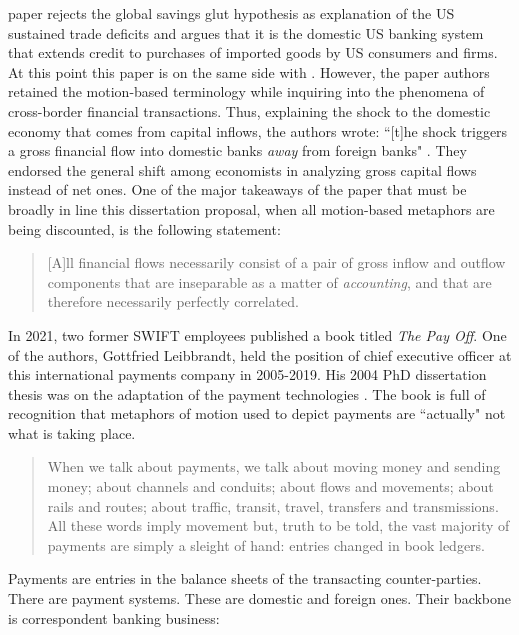 \cite{kumhof2020} paper rejects the global savings glut hypothesis as explanation of the US sustained trade deficits and argues that it is the domestic US banking system that extends credit to purchases of imported goods by US consumers and firms.
At this point this paper is on the same side with \cite{mosler2010,mosler2023}.
However, the paper authors retained the motion-based terminology while inquiring into the phenomena of cross-border financial transactions.
Thus, explaining the shock to the domestic economy that comes from capital inflows, the authors wrote: ``[t]he shock triggers a gross financial flow into domestic banks \textit{away} from foreign banks" \citep[p.~4, emphasis added]{kumhof2020}.
They endorsed the general shift among economists in analyzing gross capital flows instead of net ones.
One of the major takeaways of the paper that must be broadly in line this dissertation proposal, when all motion-based metaphors are being discounted, is the following statement:

\begin{quote}
[A]ll financial flows necessarily consist of a pair of gross inflow and outflow components that are inseparable as a matter of \textit{accounting}, and that are therefore necessarily perfectly correlated. \citep[p.~11, emphasis added]{kumhof2020}
\end{quote}

In 2021, two former SWIFT employees published a book titled \textit{The Pay Off}.
One of the authors, Gottfried Leibbrandt, held the position of chief executive officer at this international payments company in 2005-2019. His 2004 PhD dissertation thesis was on the adaptation of the payment technologies \citep{leibb2004}. The book is full of recognition that metaphors of motion used to depict payments are ``actually" not what is taking place.

\begin{quote}
When we talk about payments, we talk about moving money and sending money; about channels and conduits; about flows and movements; about rails and routes; about traffic, transit, travel, transfers and transmissions. All these words imply movement but, truth to be told, the vast majority of payments are simply a sleight of hand: entries changed in book ledgers. \citep[p.~13]{payoff2021}
\end{quote}

Payments are entries in the balance sheets of the transacting counter-parties. There are payment systems. These are domestic and foreign ones. Their backbone is correspondent banking business:

